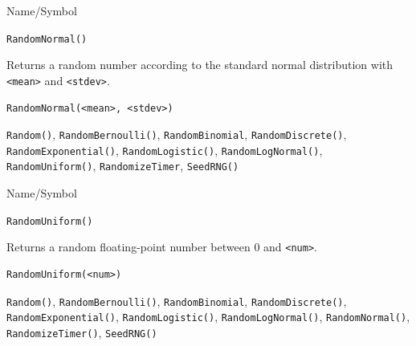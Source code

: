 \begin{desc}{Name/Symbol}
\item[Name/Symbol] 	\verb+RandomNormal()+

\item[Description] 	Returns a random number according to the standard
             	normal distribution with \verb+<mean>+ and \verb+<stdev>+.

\item[Usage]       	
\begin{verbatim}
RandomNormal(<mean>, <stdev>)
\end{verbatim}

\item[Example]	

\item[See Also]	\verb+Random()+, \verb+RandomBernoulli()+, \verb+RandomBinomial+,
		\verb+RandomDiscrete()+, \verb+RandomExponential()+, \verb+RandomLogistic()+, 
		\verb+RandomLogNormal()+, \verb+RandomUniform()+, \verb+RandomizeTimer+, \verb+SeedRNG()+
\end{desc}

\begin{desc}{Name/Symbol}
\item[Name/Symbol]	\verb+RandomUniform()+

\item[Description]	Returns a random floating-point number between 0 and \verb+<num>+.

\item[Usage]		
\begin{verbatim}
RandomUniform(<num>)
\end{verbatim}

\item[Example]	

\item[See Also] \verb+Random()+, \verb+RandomBernoulli()+,
  \verb+RandomBinomial+, \verb+RandomDiscrete()+,
  \verb+RandomExponential()+, \verb+RandomLogistic()+,
  \verb+RandomLogNormal()+, \verb+RandomNormal()+, \verb+RandomizeTimer()+,
  \verb+SeedRNG()+
\end{desc}


